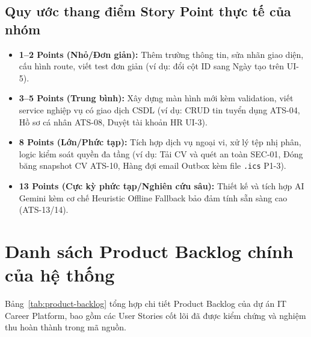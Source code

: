 \subsection{Quy ước thang điểm Story Point thực tế của nhóm}
\begin{itemize}
    \item \textbf{1--2 Points (Nhỏ/Đơn giản):} Thêm trường thông tin, sửa nhãn giao diện, cấu hình route, viết test đơn giản (ví dụ: đổi cột ID sang Ngày tạo trên UI-5).
    \item \textbf{3--5 Points (Trung bình):} Xây dựng màn hình mới kèm validation, viết service nghiệp vụ có giao dịch CSDL (ví dụ: CRUD tin tuyển dụng ATS-04, Hồ sơ cá nhân ATS-08, Duyệt tài khoản HR UI-3).
    \item \textbf{8 Points (Lớn/Phức tạp):} Tích hợp dịch vụ ngoại vi, xử lý tệp nhị phân, logic kiểm soát quyền đa tầng (ví dụ: Tải CV và quét an toàn SEC-01, Đóng băng snapshot CV ATS-10, Hàng đợi email Outbox kèm file \texttt{.ics} P1-3).
    \item \textbf{13 Points (Cực kỳ phức tạp/Nghiên cứu sâu):} Thiết kế và tích hợp AI Gemini kèm cơ chế Heuristic Offline Fallback bảo đảm tính sẵn sàng cao (ATS-13/14).
\end{itemize}

\section{Danh sách Product Backlog chính của hệ thống}
\label{sec:product-backlog}

Bảng~\ref{tab:product-backlog} tổng hợp chi tiết Product Backlog của dự án IT Career Platform, bao gồm các User Stories cốt lõi đã được kiểm chứng và nghiệm thu hoàn thành trong mã nguồn.

